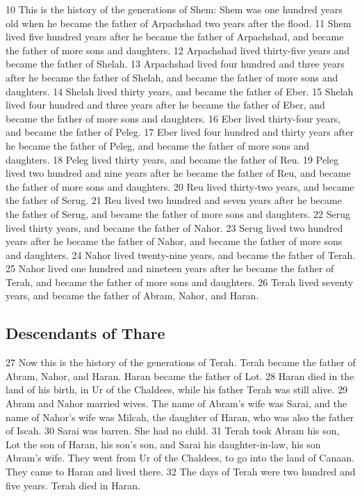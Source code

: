 {10} This is the history of the generations of Shem: Shem was one
hundred years old when he became the father of Arpachshad two years
after the flood. {11} Shem lived five hundred years after he became the
father of Arpachshad, and became the father of more sons and daughters.
{12} Arpachshad lived thirty-five years and became the father of Shelah.
{13} Arpachshad lived four hundred and three years after he became the
father of Shelah, and became the father of more sons and daughters. {14}
Shelah lived thirty years, and became the father of Eber. {15} Shelah
lived four hundred and three years after he became the father of Eber,
and became the father of more sons and daughters. {16} Eber lived
thirty-four years, and became the father of Peleg. {17} Eber lived four
hundred and thirty years after he became the father of Peleg, and became
the father of more sons and daughters. {18} Peleg lived thirty years,
and became the father of Reu. {19} Peleg lived two hundred and nine
years after he became the father of Reu, and became the father of more
sons and daughters. {20} Reu lived thirty-two years, and became the
father of Serug. {21} Reu lived two hundred and seven years after he
became the father of Serug, and became the father of more sons and
daughters. {22} Serug lived thirty years, and became the father of
Nahor. {23} Serug lived two hundred years after he became the father of
Nahor, and became the father of more sons and daughters. {24} Nahor
lived twenty-nine years, and became the father of Terah. {25} Nahor
lived one hundred and nineteen years after he became the father of
Terah, and became the father of more sons and daughters. {26} Terah
lived seventy years, and became the father of Abram, Nahor, and Haran.

\hypertarget{descendants-of-thare}{%
\subsection{Descendants of Thare}\label{descendants-of-thare}}

{27} Now this is the history of the generations of Terah. Terah became
the father of Abram, Nahor, and Haran. Haran became the father of Lot.
{28} Haran died in the land of his birth, in Ur of the Chaldees, while
his father Terah was still alive. {29} Abram and Nahor married wives.
The name of Abram's wife was Sarai, and the name of Nahor's wife was
Milcah, the daughter of Haran, who was also the father of Iscah. {30}
Sarai was barren. She had no child. {31} Terah took Abram his son, Lot
the son of Haran, his son's son, and Sarai his daughter-in-law, his son
Abram's wife. They went from Ur of the Chaldees, to go into the land of
Canaan. They came to Haran and lived there. {32} The days of Terah were
two hundred and five years. Terah died in Haran.

